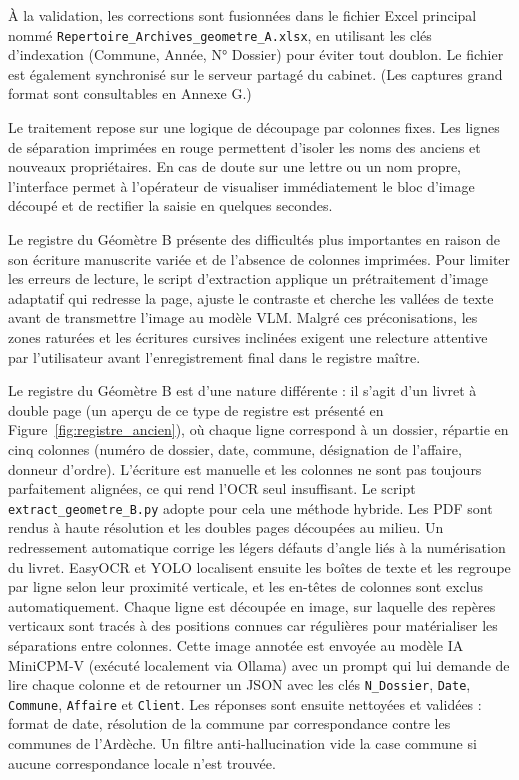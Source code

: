 À la validation, les corrections sont fusionnées dans le fichier Excel principal nommé {\small\texttt{Repertoire\_Archives\_geometre\_A.xlsx}}, en utilisant les clés d'indexation (Commune, Année, N° Dossier) pour éviter tout doublon. Le fichier est également synchronisé sur le serveur partagé du cabinet. (Les captures grand format sont consultables en Annexe G.)

Le traitement repose sur une logique de découpage par colonnes fixes. Les lignes de séparation imprimées en rouge permettent d'isoler les noms des anciens et nouveaux propriétaires. En cas de doute sur une lettre ou un nom propre, l'interface permet à l'opérateur de visualiser immédiatement le bloc d'image découpé et de rectifier la saisie en quelques secondes.

Le registre du Géomètre B présente des difficultés plus importantes en raison de son écriture manuscrite variée et de l'absence de colonnes imprimées. Pour limiter les erreurs de lecture, le script d'extraction applique un prétraitement d'image adaptatif qui redresse la page, ajuste le contraste et cherche les vallées de texte avant de transmettre l'image au modèle VLM. Malgré ces préconisations, les zones raturées et les écritures cursives inclinées exigent une relecture attentive par l'utilisateur avant l'enregistrement final dans le registre maître.

Le registre du Géomètre B est d'une nature différente : il s'agit d'un livret à double page (un aperçu de ce type de registre est présenté en Figure~\ref{fig:registre_ancien}), où chaque ligne correspond à un dossier, répartie en cinq colonnes (numéro de dossier, date, commune, désignation de l'affaire, donneur d'ordre). L'écriture est manuelle et les colonnes ne sont pas toujours parfaitement alignées, ce qui rend l'OCR seul insuffisant. Le script \texttt{extract\_geometre\_B.py} adopte pour cela une méthode hybride. Les PDF sont rendus à haute résolution et les doubles pages découpées au milieu. Un redressement automatique corrige les légers défauts d'angle liés à la numérisation du livret. EasyOCR et YOLO localisent ensuite les boîtes de texte et les regroupe par ligne selon leur proximité verticale, et les en-têtes de colonnes sont exclus automatiquement. Chaque ligne est découpée en image, sur laquelle des repères verticaux sont tracés à des positions connues car régulières pour matérialiser les séparations entre colonnes. Cette image annotée est envoyée au modèle IA MiniCPM-V (exécuté localement via Ollama) avec un prompt qui lui demande de lire chaque colonne et de retourner un JSON avec les clés \texttt{N\_Dossier}, \texttt{Date}, \texttt{Commune}, \texttt{Affaire} et \texttt{Client}. Les réponses sont ensuite nettoyées et validées : format de date, résolution de la commune par correspondance contre les communes de l'Ardèche. Un filtre anti-hallucination vide la case commune si aucune correspondance locale n'est trouvée.

